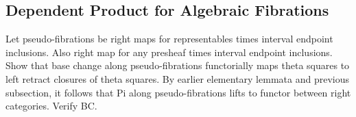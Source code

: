 \documentclass[reqno,10pt,a4paper,oneside]{amsart}
\begin{document}
\subsection{Dependent Product for Algebraic Fibrations}

Let pseudo-fibrations be right maps for representables times interval endpoint inclusions.
Also right map for any presheaf times interval endpoint inclusions.
Show that base change along pseudo-fibrations functorially maps theta squares to left retract closures of theta squares.
By earlier elementary lemmata and previous subsection, it follows that Pi along pseudo-fibrations lifts to functor between right categories.
Verify BC.



\end{document}
